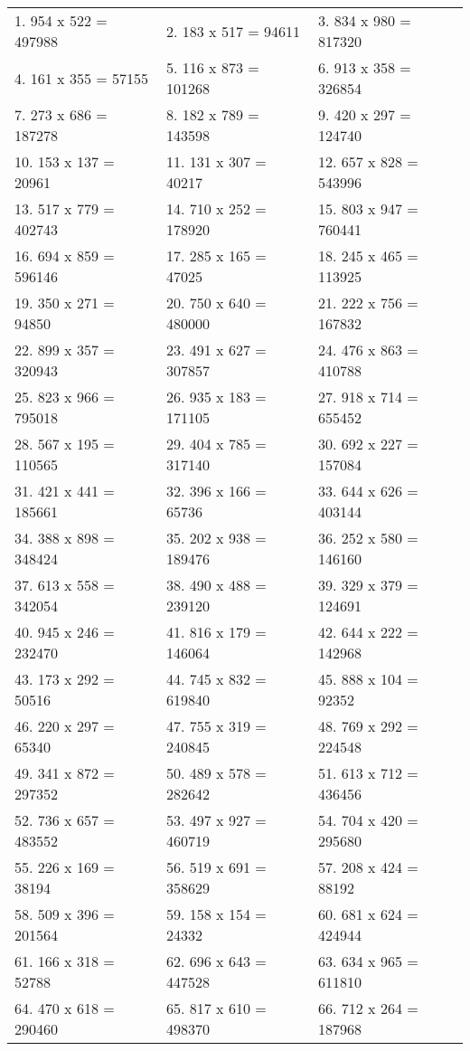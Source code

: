 \documentclass[a4paper]{article}
\begin{document}
\begin{tabularx}{\textwidth}{ |X|X|X| }
1. 954 x 522 = 497988  &  2. 183 x 517 = 94611  &  3. 834 x 980 = 817320  \\
4. 161 x 355 = 57155  &  5. 116 x 873 = 101268  &  6. 913 x 358 = 326854  \\
7. 273 x 686 = 187278  &  8. 182 x 789 = 143598  &  9. 420 x 297 = 124740  \\
10. 153 x 137 = 20961  &  11. 131 x 307 = 40217  &  12. 657 x 828 = 543996  \\
13. 517 x 779 = 402743  &  14. 710 x 252 = 178920  &  15. 803 x 947 = 760441  \\
16. 694 x 859 = 596146  &  17. 285 x 165 = 47025  &  18. 245 x 465 = 113925  \\
19. 350 x 271 = 94850  &  20. 750 x 640 = 480000  &  21. 222 x 756 = 167832  \\
22. 899 x 357 = 320943  &  23. 491 x 627 = 307857  &  24. 476 x 863 = 410788  \\
25. 823 x 966 = 795018  &  26. 935 x 183 = 171105  &  27. 918 x 714 = 655452  \\
28. 567 x 195 = 110565  &  29. 404 x 785 = 317140  &  30. 692 x 227 = 157084  \\
31. 421 x 441 = 185661  &  32. 396 x 166 = 65736  &  33. 644 x 626 = 403144  \\
34. 388 x 898 = 348424  &  35. 202 x 938 = 189476  &  36. 252 x 580 = 146160  \\
37. 613 x 558 = 342054  &  38. 490 x 488 = 239120  &  39. 329 x 379 = 124691  \\
40. 945 x 246 = 232470  &  41. 816 x 179 = 146064  &  42. 644 x 222 = 142968  \\
43. 173 x 292 = 50516  &  44. 745 x 832 = 619840  &  45. 888 x 104 = 92352  \\
46. 220 x 297 = 65340  &  47. 755 x 319 = 240845  &  48. 769 x 292 = 224548  \\
49. 341 x 872 = 297352  &  50. 489 x 578 = 282642  &  51. 613 x 712 = 436456  \\
52. 736 x 657 = 483552  &  53. 497 x 927 = 460719  &  54. 704 x 420 = 295680  \\
55. 226 x 169 = 38194  &  56. 519 x 691 = 358629  &  57. 208 x 424 = 88192  \\
58. 509 x 396 = 201564  &  59. 158 x 154 = 24332  &  60. 681 x 624 = 424944  \\
61. 166 x 318 = 52788  &  62. 696 x 643 = 447528  &  63. 634 x 965 = 611810  \\
64. 470 x 618 = 290460  &  65. 817 x 610 = 498370  &  66. 712 x 264 = 187968  \\
\end{tabularx}

\end{document}
